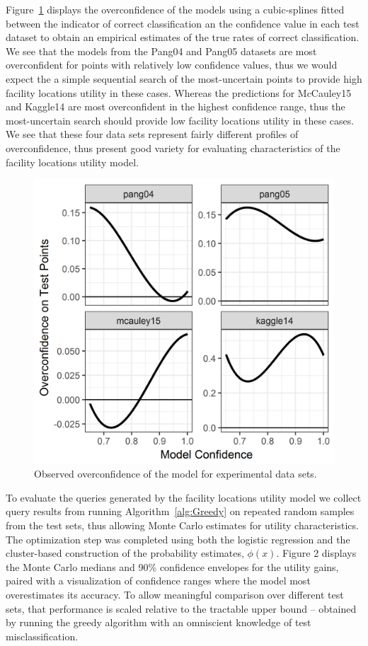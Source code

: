 \documentclass[letterpaper]{article} %
\begin{document}
Figure~\ref{fig:overconf} displays the overconfidence of the models using a cubic-splines fitted between the indicator of correct classification an the confidence value in each test dataset to obtain an empirical estimates of the true rates of correct classification. We see that the models from the Pang04 and Pang05 datasets are most overconfident for points with relatively low confidence values, thus we would expect the a simple sequential search of the most-uncertain points to provide high facility locations utility in these cases. Whereas the predictions for McCauley15 and Kaggle14 are most overconfident in the highest confidence range, thus the most-uncertain search should provide low facility locations utility in these cases. We see that these four data sets represent fairly different profiles of overconfidence, thus present good variety for evaluating characteristics of the facility locations utility model. 

\begin{figure}[hbtp]
  \includegraphics[width=.45\textwidth]{../experimentsAndPlots/overconfidence.png}
  \caption{Observed overconfidence of the model for experimental data sets.}
  \label{fig:overconf}
\end{figure}

To evaluate the queries generated by the facility locations utility model we collect query results from running Algorithm~\ref{alg:Greedy} on repeated random samples from the test sets, thus allowing Monte Carlo estimates for utility characteristics. The optimization step was completed using both the logistic regression and the cluster-based construction of the probability estimates, $\phi(x)$. Figure 2 displays the Monte Carlo medians and 90\% confidence envelopes for the utility gains, paired with a visualization of confidence ranges where the model most overestimates its accuracy. To allow meaningful comparison over different test sets, that performance is scaled relative to the tractable upper bound – obtained by running the greedy algorithm with an omniscient knowledge of test misclassification. 
\end{document}
